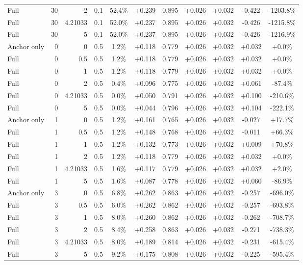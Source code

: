 \begin{table}[htbp]
\begin{tabular}{lrrrccccccc}
Full & 30 & 2 & 0.1 & 52.4\% & +0.239 & 0.895 & +0.026 & +0.032 & -0.422 & -1203.8\% \\
Full & 30 & 4.21033 & 0.1 & 52.0\% & +0.237 & 0.895 & +0.026 & +0.032 & -0.426 & -1215.8\% \\
Full & 30 & 5 & 0.1 & 52.0\% & +0.237 & 0.895 & +0.026 & +0.032 & -0.426 & -1216.9\% \\
Anchor only & 0 & 0 & 0.5 & 1.2\% & +0.118 & 0.779 & +0.026 & +0.032 & +0.032 & +0.0\% \\
Full & 0 & 0.5 & 0.5 & 1.2\% & +0.118 & 0.779 & +0.026 & +0.032 & +0.032 & +0.0\% \\
Full & 0 & 1 & 0.5 & 1.2\% & +0.118 & 0.779 & +0.026 & +0.032 & +0.032 & +0.0\% \\
Full & 0 & 2 & 0.5 & 0.4\% & +0.096 & 0.775 & +0.026 & +0.032 & +0.061 & -87.4\% \\
Full & 0 & 4.21033 & 0.5 & 0.0\% & +0.050 & 0.791 & +0.026 & +0.032 & +0.100 & -210.6\% \\
Full & 0 & 5 & 0.5 & 0.0\% & +0.044 & 0.796 & +0.026 & +0.032 & +0.104 & -222.1\% \\
Anchor only & 1 & 0 & 0.5 & 1.2\% & +0.161 & 0.765 & +0.026 & +0.032 & -0.027 & +17.7\% \\
Full & 1 & 0.5 & 0.5 & 1.2\% & +0.148 & 0.768 & +0.026 & +0.032 & -0.011 & +66.3\% \\
Full & 1 & 1 & 0.5 & 1.2\% & +0.132 & 0.773 & +0.026 & +0.032 & +0.009 & +70.8\% \\
Full & 1 & 2 & 0.5 & 1.2\% & +0.118 & 0.779 & +0.026 & +0.032 & +0.032 & +0.0\% \\
Full & 1 & 4.21033 & 0.5 & 1.6\% & +0.117 & 0.779 & +0.026 & +0.032 & +0.032 & +2.0\% \\
Full & 1 & 5 & 0.5 & 1.6\% & +0.087 & 0.778 & +0.026 & +0.032 & +0.060 & -86.9\% \\
Anchor only & 3 & 0 & 0.5 & 6.8\% & +0.262 & 0.863 & +0.026 & +0.032 & -0.257 & -696.0\% \\
Full & 3 & 0.5 & 0.5 & 6.0\% & +0.262 & 0.862 & +0.026 & +0.032 & -0.257 & -693.8\% \\
Full & 3 & 1 & 0.5 & 8.0\% & +0.260 & 0.862 & +0.026 & +0.032 & -0.262 & -708.7\% \\
Full & 3 & 2 & 0.5 & 8.4\% & +0.258 & 0.863 & +0.026 & +0.032 & -0.271 & -738.3\% \\
Full & 3 & 4.21033 & 0.5 & 8.0\% & +0.189 & 0.814 & +0.026 & +0.032 & -0.231 & -615.4\% \\
Full & 3 & 5 & 0.5 & 9.2\% & +0.175 & 0.808 & +0.026 & +0.032 & -0.225 & -595.4\% \\

\end{tabular}
\end{table}
